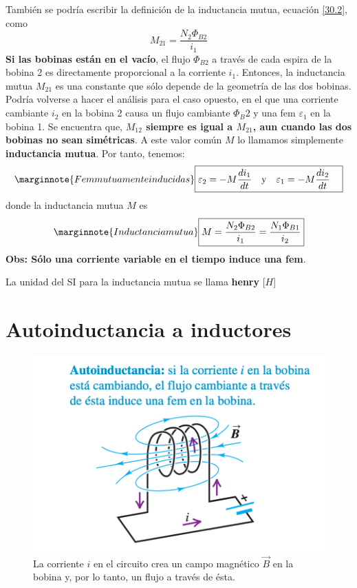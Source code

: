 También se podría escribir la definición de la inductancia mutua, ecuación \ref{30.2}, como
\begin{equation}
M_{21}=\frac{N_2\Phi_{B2}}{i_1}
\end{equation}
\textbf{Si las bobinas están en el vacío}, el flujo $\Phi_{B2}$ a través de cada espira de la bobina 2 es directamente proporcional a la corriente $i_1$. Entonces, la inductancia mutua $M_{21}$ es una constante que sólo depende de la geometría de las dos bobinas.
Podría volverse a hacer el análisis para el caso opuesto, en el que una corriente cambiante $i_2$ en la bobina 2 causa un flujo cambiante $\Phi_{B}2$ y una fem $\varepsilon_1$ en la bobina 1. Se encuentra que, \textbf{$M_{12}$ siempre es igual a $M_{21}$, aun cuando las dos bobinas no sean simétricas}. A este valor común $M$ lo llamamos simplemente \textbf{inductancia mutua}. Por tanto, tenemos:
\begin{equation}\marginnote{Fem mutuamente inducidas}
\boxed{\varepsilon_2=-M\frac{di_1}{dt}\quad\mathrm{y}\quad \varepsilon_1=-M\frac{di_2}{dt}\quad}
\end{equation}
donde la inductancia mutua $M$ es
\begin{equation}\marginnote{Inductancia mutua}
\boxed{M=\frac{N_2\Phi_{B2}}{i_1}=\frac{N_1\Phi_{B1}}{i_2}}
\end{equation}
\textbf{Obs: Sólo una corriente variable en el tiempo induce una fem}.

La unidad del SI para la inductancia mutua se llama \textbf{henry} [$H$]
\section{Autoinductancia a inductores}
\begin{figure}[h]\label{fig:autoinductancia}
\centering
\includegraphics[scale=0.4]{fig/autoinductancia}
\caption{La corriente $i$ en el circuito crea un campo magnético $\vec{B}$ en la bobina y, por lo tanto, un flujo a través de ésta.}
\end{figure}

